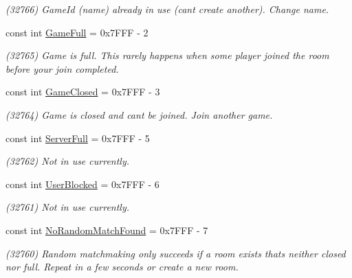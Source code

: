 \begin{DoxyCompactItemize}
\begin{DoxyCompactList}\small\item\em (32766) Game\+Id (name) already in use (can\textquotesingle{}t create another). Change name.\end{DoxyCompactList}\item 
const int \hyperlink{class_exit_games_1_1_client_1_1_photon_1_1_chat_1_1_error_code_aefa4bbc103cc10797c8b695ec03544b0}{Game\+Full} = 0x7\+F\+F\+F -\/ 2
\begin{DoxyCompactList}\small\item\em (32765) Game is full. This rarely happens when some player joined the room before your join completed.\end{DoxyCompactList}\item 
const int \hyperlink{class_exit_games_1_1_client_1_1_photon_1_1_chat_1_1_error_code_a5ece2c1d9636a3725b3d38dffaeafad2}{Game\+Closed} = 0x7\+F\+F\+F -\/ 3
\begin{DoxyCompactList}\small\item\em (32764) Game is closed and can\textquotesingle{}t be joined. Join another game.\end{DoxyCompactList}\item 
const int \hyperlink{class_exit_games_1_1_client_1_1_photon_1_1_chat_1_1_error_code_a2c770f32de9265fe53d881768167d7b4}{Server\+Full} = 0x7\+F\+F\+F -\/ 5
\begin{DoxyCompactList}\small\item\em (32762) Not in use currently.\end{DoxyCompactList}\item 
const int \hyperlink{class_exit_games_1_1_client_1_1_photon_1_1_chat_1_1_error_code_a989671a923b1616f8831545f9e5baf01}{User\+Blocked} = 0x7\+F\+F\+F -\/ 6
\begin{DoxyCompactList}\small\item\em (32761) Not in use currently.\end{DoxyCompactList}\item 
const int \hyperlink{class_exit_games_1_1_client_1_1_photon_1_1_chat_1_1_error_code_ae5450434e0a521ecfa9491c225e59fce}{No\+Random\+Match\+Found} = 0x7\+F\+F\+F -\/ 7
\begin{DoxyCompactList}\small\item\em (32760) Random matchmaking only succeeds if a room exists thats neither closed nor full. Repeat in a few seconds or create a new room.\end{DoxyCompactList}\item 

\end{DoxyCompactItemize}
